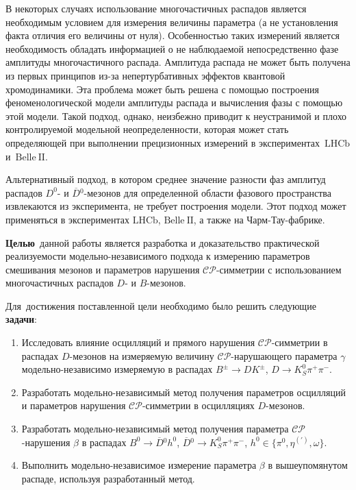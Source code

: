 \documentclass[a4paper,14pt]{extarticle} %
\newcommand{\dn}{\ensuremath{D^0}\xspace}
\newcommand{\bn}{\ensuremath{B^0}\xspace}
\newcommand{\hn}{\ensuremath{h^0}\xspace}
\newcommand{\dbar}{\ensuremath{\overline{D}}\xspace}
\newcommand{\dnbar}{\ensuremath{\dbar{}^0}\xspace}
\newcommand{\ks}{\ensuremath{K_S^0}\xspace}
\newcommand{\pin}{\ensuremath{\pi^0}\xspace}
\newcommand{\pphi}{\ensuremath{\beta}\xspace}
\newcommand{\gphi}{\ensuremath{\gamma}\xspace}
\newcommand{\bdk}{\ensuremath{B^{\pm}\to D K^{\pm}}\xspace}
\newcommand{\dkpp}{\ensuremath{D\to\ks\pi^+\pi^-}\xspace}
\newcommand{\dbkpp}{\ensuremath{\dnbar\to\ks\pi^+\pi^-}\xspace}
\newcommand{\bdh}{\ensuremath{\bn\to\dnbar\hn}\xspace}
\newcommand{\cpconj}{\ensuremath{\mathcal{CP}}\xspace}
\newcommand{\belle}{\ensuremath{\mathrm{Belle}}\xspace}
\newcommand{\belleii}{\ensuremath{\belle\:\mathrm{II}}\xspace}
\newcommand{\lhcb}{\ensuremath{\mathrm{LHCb}}\xspace}
\begin{document}
В некоторых случаях использование многочастичных распадов является необходимым условием для измерения величины параметра (а не установления факта отличия его величины от нуля).  Особенностью таких измерений является необходимость обладать информацией о не наблюдаемой непосредственно фазе амплитуды многочастичного распада.  Амплитуда распада не может быть получена из первых принципов из-за непертурбативных эффектов квантовой хромодинамики.  Эта проблема может быть решена с помощью построения феноменологической модели амплитуды распада и вычисления фазы с помощью этой модели.  
Такой подход, однако, неизбежно приводит к неустранимой и плохо контролируемой модельной неопределенности, которая может стать определяющей при выполнении прецизионных измерений в экспериментах~\lhcb и~\belleii.

Альтернативный подход, в котором среднее значение разности фаз амплитуд распадов \dn- и \dnbar-мезонов для определенной области фазового пространства извлекаются из эксперимента, не требует построения модели.  Этот подход может применяться в экспериментах \lhcb, \belleii, а также на Чарм-Тау-фабрике.

\textbf{Целью}\ данной работы является разработка и доказательство практической реализуемости модельно-независимого подхода к измерению параметров смешивания мезонов и параметров нарушения \cpconj-симметрии с использованием многочастичных распадов $D$- и $B$-мезонов.

Для~достижения поставленной цели необходимо было решить следующие \textbf{задачи}:
\begin{enumerate}
  \item Исследовать влияние осцилляций и прямого нарушения \cpconj-симметрии в распадах $D$-мезонов на измеряемую величину \cpconj-нарушающего параметра \gphi модельно-независимо измеряемую в распадах \bdk, \dkpp.
  \item Разработать модельно-независимый метод получения параметров осцилляций и параметров нарушения \cpconj-симметрии в осцилляциях $D$-мезонов.
  \item Разработать модельно-независимый метод получения параметра \cpconj-нарушения \pphi в распадах \bdh, \dbkpp, $h^0\in\{\pin,\eta^{(\prime)},\omega\}$.
  \item Выполнить модельно-независимое измерение параметра \pphi в вышеупомянутом распаде, используя разработанный метод.
\end{enumerate}
\end{document}
